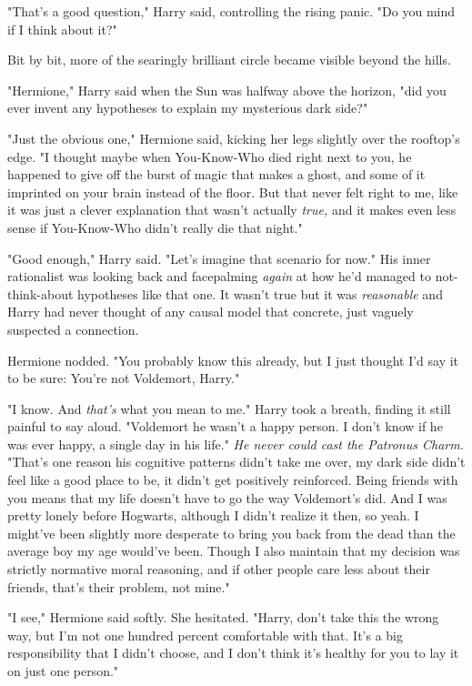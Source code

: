 "That's a good question," Harry said, controlling the rising panic. "Do you
mind if I think about it?"

Bit by bit, more of the searingly brilliant circle became visible beyond the
hills.

"Hermione," Harry said when the Sun was halfway above the horizon, "did you
ever invent any hypotheses to explain my mysterious dark side?"

"Just the obvious one," Hermione said, kicking her legs slightly over the
rooftop's edge. "I thought maybe when You-Know-Who died right next to you, he
happened to give off the burst of magic that makes a ghost, and some of it
imprinted on your brain instead of the floor. But that never felt right to me,
like it was just a clever explanation that wasn't actually \emph{true,} and it
makes even less sense if You-Know-Who didn't really die that night."

"Good enough," Harry said. "Let's imagine that scenario for now." His inner
rationalist was looking back and facepalming \emph{again} at how he'd managed
to not-think-about hypotheses like that one. It wasn't true but it was
\emph{reasonable} and Harry had never thought of any causal model that
concrete, just vaguely suspected a connection.

Hermione nodded. "You probably know this already, but I just thought I'd say it
to be sure: You're not Voldemort, Harry."

"I know. And \emph{that's} what you mean to me." Harry took a breath, finding
it still painful to say aloud. "Voldemort{\el} he wasn't a happy person. I
don't know if he was ever happy, a single day in his life." \emph{He never
could cast the Patronus Charm.} "That's one reason his cognitive patterns
didn't take me over, my dark side didn't feel like a good place to be, it
didn't get positively reinforced. Being friends with you means that my life
doesn't have to go the way Voldemort's did. And I was pretty lonely before
Hogwarts, although I didn't realize it then, so{\el} yeah. I might've been
slightly more desperate to bring you back from the dead than the average boy my
age would've been. Though I also maintain that my decision was strictly
normative moral reasoning, and if other people care less about their friends,
that's their problem, not mine."

"I see," Hermione said softly. She hesitated. "Harry, don't take this the wrong
way, but I'm not one hundred percent comfortable with that. It's a big
responsibility that I didn't choose, and I don't think it's healthy for you to
lay it on just one person."

